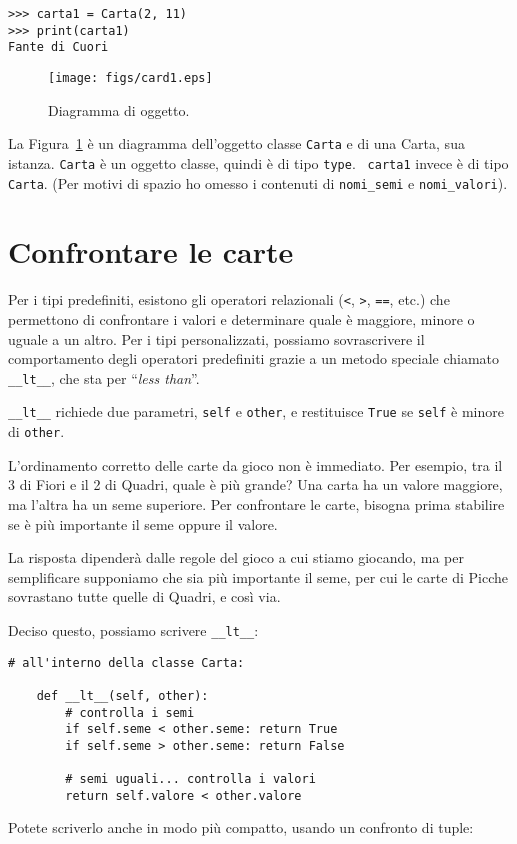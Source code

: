 \documentclass[10pt]{book}
\begin{document}
\begin{verbatim}
>>> carta1 = Carta(2, 11)
>>> print(carta1)
Fante di Cuori
\end{verbatim}

\begin{figure}
\centerline
{\texttt{[image: figs/card1.eps]}}
\caption{Diagramma di oggetto.}
\label{fig.card1}
\end{figure}

La Figura~\ref{fig.card1} è un diagramma dell'oggetto classe {\tt Carta} e di una Carta, sua istanza.
{\tt Carta} è un oggetto classe, quindi è di tipo {\tt type}.  {\tt
carta1} invece è di tipo {\tt Carta}.  (Per motivi di spazio ho omesso i contenuti di \verb"nomi_semi" e \verb"nomi_valori").

\section{Confrontare le carte}
\label{comparecard}


Per i tipi predefiniti, esistono gli operatori relazionali
({\tt <}, {\tt >}, {\tt ==}, etc.)
che permettono di confrontare i valori e determinare quale è maggiore, minore o uguale a un altro. Per i tipi personalizzati, possiamo sovrascrivere il comportamento degli operatori predefiniti grazie a un metodo speciale chiamato
\verb"__lt__", che sta per ``{\em less than}''.  

\verb"__lt__" richiede due parametri, {\tt self} e {\tt other},
e restituisce {\tt True} se {\tt self} è minore di {\tt other}.

L'ordinamento corretto delle carte da gioco non è immediato. Per esempio, tra il 3 di Fiori e il 2 di Quadri, quale è più grande? Una carta ha un valore maggiore, ma l'altra ha un seme superiore. Per confrontare le carte, bisogna prima stabilire se è più importante il seme oppure il valore.

La risposta dipenderà dalle regole del gioco a cui stiamo giocando, ma per semplificare supponiamo che sia più importante il seme, per cui le carte di Picche sovrastano tutte quelle di Quadri, e così via.

Deciso questo, possiamo scrivere \verb"__lt__":

\begin{verbatim}
# all'interno della classe Carta:

    def __lt__(self, other):
        # controlla i semi
        if self.seme < other.seme: return True
        if self.seme > other.seme: return False

        # semi uguali... controlla i valori
        return self.valore < other.valore

\end{verbatim}
%
Potete scriverlo anche in modo più compatto, usando un confronto di tuple:
\end{document}
